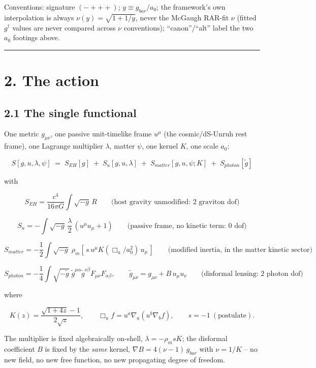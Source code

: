 \documentclass[
]{article}
\begin{document}
Conventions: signature \((-+++)\); \(y \equiv g_{bar}/a_0\); the
framework's own interpolation is always \(\nu(y) = \sqrt{1+1/y}\), never
the McGaugh RAR-fit \(\nu\) (fitted \(g^\dagger\) values are never
compared across \(\nu\) conventions); ``canon''/``alt'' label the two
\(a_0\) footings above.

\begin{center}\rule{0.5\linewidth}{0.5pt}\end{center}

\section{2. The action}\label{the-action}

\subsection{2.1 The single functional}\label{the-single-functional}

One metric \(g_{\mu\nu}\), one passive unit-timelike frame \(u^\mu\)
(the cosmic/dS-Unruh rest frame), one Lagrange multiplier \(\lambda\),
matter \(\psi\), one kernel \(K\), one scale \(a_0\):

\[ S[g,u,\lambda,\psi] \;=\; S_{EH}[g] \;+\; S_u[g,u,\lambda] \;+\; S_{matter}[g,u,\psi;K] \;+\; S_{photon}[\tilde g] \]

with

\[ S_{EH} = \frac{c^4}{16\pi G}\int \sqrt{-g}\, R \qquad \text{(host gravity unmodified: 2 graviton dof)} \]

\[ S_u = -\int \sqrt{-g}\, \frac{\lambda}{2}\,(u^\mu u_\mu + 1) \qquad \text{(passive frame, no kinetic term: 0 dof)} \]

\[ S_{matter} = -\frac{1}{2}\int \sqrt{-g}\; \rho_m \left[\, s\, u^\mu K(\Box_u/a_0^2)\, u_\mu \,\right] \qquad \text{(modified inertia, in the matter kinetic sector)} \]

\[ S_{photon} = -\frac{1}{4}\int \sqrt{-\tilde g}\; \tilde g^{\mu\alpha}\tilde g^{\nu\beta} F_{\mu\nu}F_{\alpha\beta}, \qquad \tilde g_{\mu\nu} = g_{\mu\nu} + B\, u_\mu u_\nu \qquad \text{(disformal lensing: 2 photon dof)} \]

where

\[ K(z) = \frac{\sqrt{1+4z}-1}{2\sqrt{z}}, \qquad \Box_u f = u^a\nabla_a(u^b \nabla_b f), \qquad s = -1 \ (\text{postulate}). \]

The multiplier is fixed algebraically on-shell,
\(\lambda = -\rho_m s K\); the disformal coefficient \(B\) is fixed by
the \emph{same} kernel, \(\nabla B = 4(\nu-1)\, g_{bar}\) with
\(\nu = 1/K\) -- no new field, no new free function, no new propagating
degree of freedom.
\end{document}
